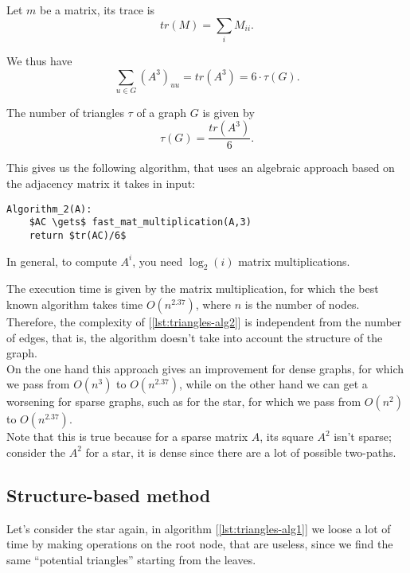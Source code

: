 \begin{defn}
    Let $m$ be a matrix, its trace is
    \begin{equation}\label{eq:trace}
        tr(M) = \sum_i M_{ii}.
    \end{equation}
\end{defn}

We thus have
\[
	\sum_{u \in G}{\left(A^3\right)_{uu}} = tr(A^3) = 6 \cdot \tau(G).
\]

\begin{thm}\label{thm:triangles-1}
    The number of triangles $\tau$ of a graph $G$ is given by
	$$\tau(G) = \frac{tr(A^3)}{6}.$$
\end{thm}

This gives us the following algorithm, that uses an algebraic approach based on the adjacency matrix it takes in input:
\begin{lstlisting}[caption={Algorithm 2}, label={lst:triangles-alg2}]
Algorithm_2(A):
    $AC \gets$ fast_mat_multiplication(A,3)
    return $tr(AC)/6$
\end{lstlisting}

\obs In general, to compute $A^i$, you need $\log_2(i)$ matrix multiplications.

\obs The execution time is given by the matrix multiplication, for which the best known algorithm takes time $O(n^{2.37})$, where $n$ is the number of nodes. Therefore, the complexity of [\ref{lst:triangles-alg2}] is independent from the number of edges, that is, the algorithm doesn't take into account the structure of the graph.\\
On the one hand this approach gives an improvement for dense graphs, for which we pass from $O(n^3)$ to $O(n^{2.37})$, while on the other hand we can get a worsening for sparse graphs, such as for the star, for which we pass from $O(n^2)$ to $O(n^{2.37})$.\\
Note that this is true because for a sparse matrix $A$, its square $A^2$ isn't sparse; consider the $A^2$ for a star, it is dense since there are a lot of possible two-paths.


\subsection{Structure-based method}\label{sec:triangles-structure}

Let's consider the star again, in algorithm [\ref{lst:triangles-alg1}] we loose a lot of time by making operations on the root node, that are useless, since we find the same ``potential triangles'' starting from the leaves.

